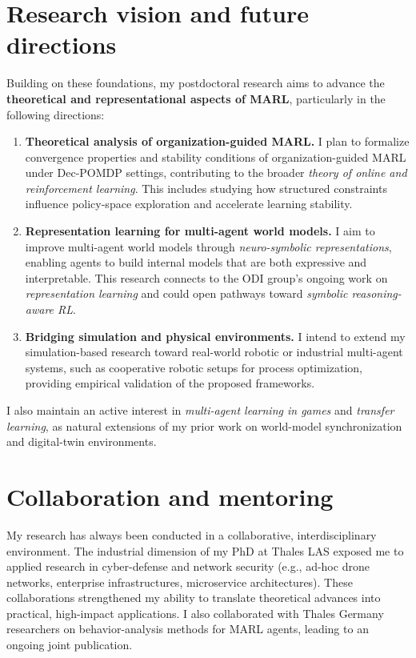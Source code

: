 \documentclass[11pt,a4paper,sans]{moderncv}
\begin{document}
\section*{Research vision and future directions}

Building on these foundations, my postdoctoral research aims to advance the \textbf{theoretical and representational aspects of MARL}, particularly in the following directions:

\begin{enumerate}
  \item \textbf{Theoretical analysis of organization-guided MARL.}
        I plan to formalize convergence properties and stability conditions of organization-guided MARL under Dec-POMDP settings, contributing to the broader \emph{theory of online and reinforcement learning}. This includes studying how structured constraints influence policy-space exploration and accelerate learning stability.

  \item \textbf{Representation learning for multi-agent world models.}
        I aim to improve multi-agent world models through \emph{neuro-symbolic representations}, enabling agents to build internal models that are both expressive and interpretable. This research connects to the ODI group's ongoing work on \emph{representation learning} and could open pathways toward \emph{symbolic reasoning-aware RL}.

  \item \textbf{Bridging simulation and physical environments.}
        I intend to extend my simulation-based research toward real-world robotic or industrial multi-agent systems, such as cooperative robotic setups for process optimization, providing empirical validation of the proposed frameworks.
\end{enumerate}

I also maintain an active interest in \emph{multi-agent learning in games} and \emph{transfer learning}, as natural extensions of my prior work on world-model synchronization and digital-twin environments.

\section*{Collaboration and mentoring}

My research has always been conducted in a collaborative, interdisciplinary environment.
The industrial dimension of my PhD at Thales LAS exposed me to applied research in cyber-defense and network security (e.g., ad-hoc drone networks, enterprise infrastructures, microservice architectures).
These collaborations strengthened my ability to translate theoretical advances into practical, high-impact applications.
I also collaborated with Thales Germany researchers on behavior-analysis methods for MARL agents, leading to an ongoing joint publication.
\end{document}

